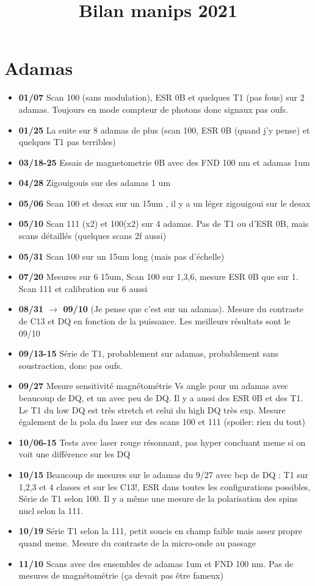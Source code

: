 \documentclass[a4paper]{article}
\title{Bilan manips 2021}
\begin{document}
\maketitle
\section{Adamas}
\begin{itemize}
\item \textbf{01/07} Scan 100 (sans modulation), ESR 0B et quelques T1 (pas fous) sur 2 adamas. Toujours en mode compteur de photons donc signaux pas oufs.
\item \textbf{01/25} La suite sur 8 adamas de plus (scan 100, ESR 0B (quand j'y pense) et quelques T1 pas terribles)
\item \textbf{03/18-25} Essais de magnetometrie 0B avec des FND 100 nm et adamas 1um
\item \textbf{04/28} Zigouigouis sur des adamas 1 um
\item \textbf{05/06} Scan 100 et desax sur un 15um , il y a un léger zigouigoui sur le desax
\item \textbf{05/10} Scan 111 (x2) et 100(x2) sur 4 adamas. Pas de T1 ou d'ESR 0B, mais scans détaillés (quelques scans 2f aussi)
\item \textbf{05/31} Scan 100 sur un 15um long (mais pas d'échelle)
\item \textbf{07/20} Mesures sur 6 15um, Scan 100 sur 1,3,6, mesure ESR 0B que sur 1. Scan 111 et calibration sur 6 aussi
\item \textbf{08/31 $\to$ 09/10} (Je pense que c'est sur un adamas). Mesure du contraste de C13 et DQ en fonction de la puissance. Les meilleurs résultats sont le 09/10
\item \textbf{09/13-15} Série de T1, probablement sur adamas, probablement sans soustraction, donc pas oufs.
\item \textbf{09/27} Mesure sensitivité magnétométrie Vs angle pour un adamas avec beaucoup de DQ, et un avec peu de DQ. Il y a aussi des ESR 0B et des T1. Le T1 du low DQ est très stretch et celui du high DQ très exp. Mesure également de la pola du laser sur des scans 100 et 111 (spoiler: rien du tout)
\item \textbf{10/06-15} Tests avec laser rouge résonnant, pas hyper concluant meme si on voit une différence sur les DQ
\item \textbf{10/15} Beaucoup de mesures sur le adamas du 9/27 avec bcp de DQ : T1 sur 1,2,3 et 4 classes et sur les C13!, ESR dans toutes les configurations possibles, Série de T1 selon 100. Il y a même une mesure de la polarisation des spins nucl selon la 111. 
\item \textbf{10/19} Série T1 selon la 111, petit soucis en champ faible mais assez propre quand meme. Mesure du contraste de la micro-onde au passage
\item \textbf{11/10} Scans avec des ensembles de adamas 1um et FND 100 nm. Pas de mesures de magnétométrie (ça devait pas être fameux)
\end{itemize}
\end{document}
